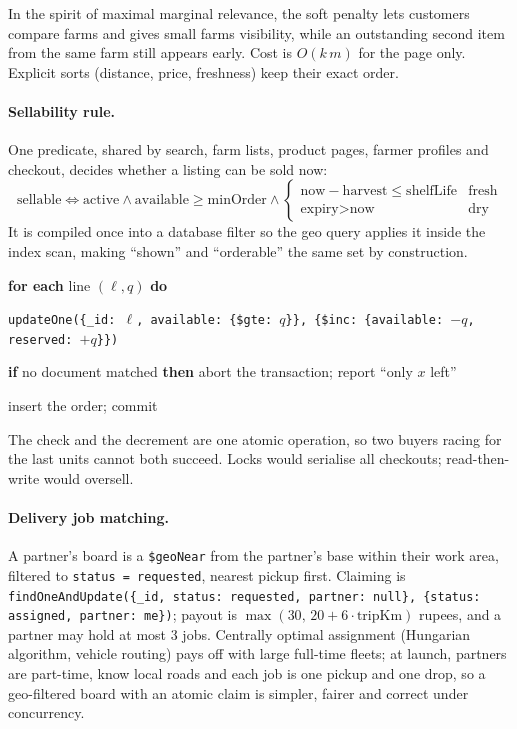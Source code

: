 \documentclass[manuscript,screen,review]{acmart}
\newcounter{pseudoline}
\newenvironment{pseudo}{\small\begin{list}{\scriptsize\arabic{pseudoline}}{\usecounter{pseudoline}\setlength{\itemsep}{1pt}\setlength{\topsep}{3pt}\setlength{\parsep}{0pt}\setlength{\leftmargin}{7mm}}}{\end{list}}
\newcommand{\kw}[1]{\textbf{#1}}
\newcommand{\ind}{\hspace*{5mm}}
\begin{document}
\noindent In the spirit of maximal marginal relevance, the soft penalty lets customers compare farms and gives small farms visibility, while an outstanding second item from the same farm still appears early. Cost is $O(k\,m)$ for the page only. Explicit sorts (distance, price, freshness) keep their exact order.

\paragraph{Sellability rule.} One predicate, shared by search, farm lists, product pages, farmer profiles and checkout, decides whether a listing can be sold now:
\[
\text{sellable} \iff \text{active} \wedge \text{available} \ge \text{minOrder} \wedge
\begin{cases}
\text{now} - \text{harvest} \le \text{shelfLife} & \text{fresh}\\
\text{expiry} > \text{now} & \text{dry}
\end{cases}
\]
It is compiled once into a database filter so the geo query applies it inside the index scan, making ``shown'' and ``orderable'' the same set by construction.

\begin{algorithm}[H]
\caption{Reserve stock for an order (inside one transaction)}
\label{alg:reserve}
\begin{pseudo}
  \item \kw{for each} line $(\ell, q)$ \kw{do}
  \item \ind \texttt{updateOne(\{\_id: $\ell$, available: \{\$gte: $q$\}\}, \{\$inc: \{available: $-q$, reserved: $+q$\}\})}
  \item \ind \kw{if} no document matched \kw{then} abort the transaction; report ``only $x$ left''
  \item insert the order; commit
\end{pseudo}
\end{algorithm}

\noindent The check and the decrement are one atomic operation, so two buyers racing for the last units cannot both succeed. Locks would serialise all checkouts; read-then-write would oversell.

\paragraph{Delivery job matching.} A partner's board is a \texttt{\$geoNear} from the partner's base within their work area, filtered to \texttt{status = requested}, nearest pickup first. Claiming is \texttt{findOneAndUpdate(\{\_id, status: requested, partner: null\}, \{status: assigned, partner: me\})}; payout is $\max(30,\, 20 + 6\cdot\text{tripKm})$ rupees, and a partner may hold at most 3 jobs. Centrally optimal assignment (Hungarian algorithm, vehicle routing) pays off with large full-time fleets; at launch, partners are part-time, know local roads and each job is one pickup and one drop, so a geo-filtered board with an atomic claim is simpler, fairer and correct under concurrency.
\end{document}
